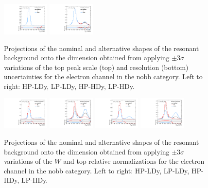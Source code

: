 \begin{figure}[htbp]
  \includegraphics[width=0.21\textwidth]{fig/uncertainties/systs_res_e_HP_nobb_HDy_resTopY_ProjY.pdf}
  \includegraphics[width=0.21\textwidth]{fig/uncertainties/systs_res_e_LP_nobb_HDy_resTopY_ProjY.pdf}\\
  \caption{
    Projections of the nominal and alternative shapes of the resonant background onto the \MJ dimension obtained from applying $\pm3\sigma$ variations of the top peak scale (top) and resolution (bottom) uncertainties for the electron channel in the nobb category.
    Left to right: HP-LDy, LP-LDy, HP-HDy, LP-HDy.
  }
  \label{fig:systResMJ_scaleTopY_resTopY}
\end{figure}

\begin{figure}[htbp]
  \centering
  \includegraphics[width=0.21\textwidth]{fig/uncertainties/systs_res_e_HP_nobb_LDy_fractionY_ProjY.pdf}
  \includegraphics[width=0.21\textwidth]{fig/uncertainties/systs_res_e_LP_nobb_LDy_fractionY_ProjY.pdf}
  \includegraphics[width=0.21\textwidth]{fig/uncertainties/systs_res_e_HP_nobb_HDy_fractionY_ProjY.pdf}
  \includegraphics[width=0.21\textwidth]{fig/uncertainties/systs_res_e_LP_nobb_HDy_fractionY_ProjY.pdf}\\
  \caption{
    Projections of the nominal and alternative shapes of the resonant background onto the \MJ dimension obtained from applying $\pm3\sigma$ variations of the $W$ and top relative normalizations for the electron channel in the nobb category.
    Left to right: HP-LDy, LP-LDy, HP-HDy, LP-HDy.
  }
  \label{fig:systResMJ_fractionY}
\end{figure}
